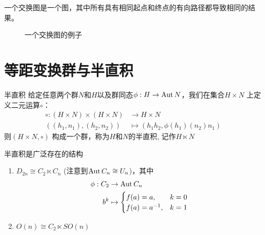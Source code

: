 \begin{definition}
    一个交换图是一个图，其中所有具有相同起点和终点的有向路径都导致相同的结果。
    \begin{figure}[H]
        \centering
        \caption{一个交换图的例子}
    \end{figure}
\end{definition}

\section{等距变换群与半直积}

\begin{definition}{半直积}
    给定任意两个群\(N\)和\(H\)以及群同态\(\phi: H \to \operatorname{\mathrm{Aut}}{N}\)，我们在集合\(H
    \times N\) 上定义二元运算\(\circ\)：
    \begin{align*}
        \circ : (H\times N)\times (H\times N) & \to H\times N \\
        ((h_{1}, n_{1}), (h_{2}, n_{2})) & \mapsto
        (h_{1}h_{2}, \phi(h_{1})(n_{2})n_{1})
    \end{align*}
    则\((H\times N, \circ )\) 构成一个群，称为\(H\)和\(N\)的半直积,
    记作\(H\ltimes N\)
\end{definition}

半直积是广泛存在的结构
\begin{enumerate}
    \item \(D_{2n}\cong C_{2}\ltimes C_{n}\) (注意到\(\operatorname{\mathrm{Aut}}
        C_{n}\cong U_{n}\))，其中
        \begin{align*}
            \phi: C_{2} & \to \operatorname{\mathrm{Aut}}{C_{n}} \\
            b^{k} & \mapsto
            \begin{cases}
                f(a)  = a, & k=0 \\
                f(a)  = a^{-1}, &k=1
            \end{cases}
        \end{align*}
    \item \(O(n)\cong C_{2} \ltimes SO(n)\)
\end{enumerate}

